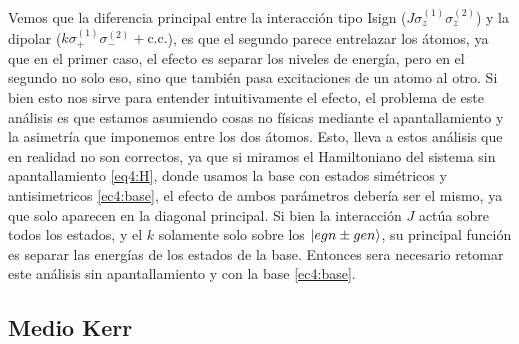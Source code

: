 Vemos que la diferencia principal entre la interacción tipo Isign ($J\sigma_z^{(1)}\sigma_z^{(2)}$) y la dipolar ($k\sigma_+^{(1)}\sigma_-^{(2)}+\text{c.c.}$), es que el segundo parece entrelazar los átomos, ya que en el primer caso, el efecto es separar los niveles de energía, pero en el segundo no solo eso, sino que también pasa excitaciones de un atomo al otro. Si bien esto nos sirve para entender intuitivamente el efecto, el problema de este análisis es que estamos asumiendo cosas no físicas mediante el apantallamiento y la asimetría que imponemos entre los dos átomos. Esto, lleva a estos análisis que en realidad no son correctos, ya que si miramos el Hamiltoniano del sistema sin apantallamiento \ref{eq4:H}, donde usamos la base con estados simétricos y antisimetricos \ref{ec4:base}, el efecto de ambos parámetros debería ser el mismo, ya que solo aparecen en la diagonal principal. Si bien la interacción $J$ actúa sobre todos los estados, y el $k$ solamente solo sobre los $\ket{egn\pm gen}$, su principal función es separar las energías de los estados de la base.
Entonces sera necesario retomar este análisis sin apantallamiento y con la base \ref{ec4:base}.
\subsection{Medio Kerr}

